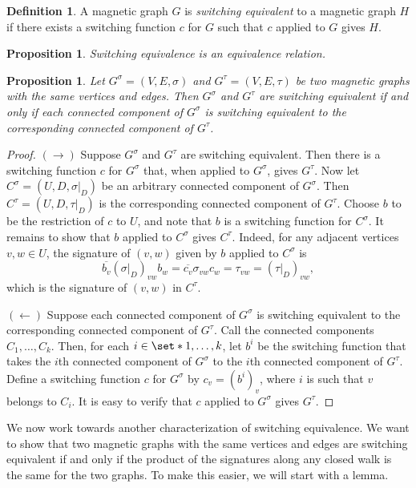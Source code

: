 \documentclass[12pt]{article}
\newtheorem{prop}[thm]{Proposition}
\theoremstyle{definition}
\newtheorem{defn}[thm]{Definition}
\begin{document}
\begin{defn}
A magnetic graph $G$ is \textit{switching equivalent} to a magnetic graph $H$ if there exists a switching function $c$ for $G$ such that $c$ applied to $G$ gives $H$.   
\end{defn}

\begin{prop}
Switching equivalence is an equivalence relation.
\end{prop}

\begin{prop}\label{switching equivalence of connected components}
Let $G^\sigma = (V, E, \sigma)$ and $G^\tau = (V, E, \tau)$ be two magnetic graphs with the same vertices and edges. Then $G^\sigma$ and $G^\tau$ are switching equivalent if and only if each connected component of $G^\sigma$ is switching equivalent to the corresponding connected component of $G^\tau$.
\end{prop}

\begin{proof}
$(\rightarrow)$ Suppose $G^\sigma$ and $G^\tau$ are switching equivalent. Then there is a switching function $c$ for $G^\sigma$ that, when applied to $G^\sigma$, gives $G^\tau$. Now let $C^\sigma=(U, D, \sigma|_{D})$ be an arbitrary connected component of $G^\sigma$. Then $C^\tau=(U, D, \tau|_{D})$ is the corresponding connected component of $G^\tau$. Choose $b$ to be the restriction of $c$ to $U$, and note that $b$ is a switching function for $C^\sigma$. It remains to show that $b$ applied to $C^\sigma$ gives $C^\tau$. Indeed, for any adjacent vertices $v, w \in U$, the signature of $(v, w)$ given by $b$ applied to $C^\sigma$ is
$$
\overline{b_v} (\sigma|_D)_{vw} b_w 
= \overline{c_v} \sigma_{vw} c_w
= \tau_{vw}
= (\tau|_{D})_{vw},
$$
which is the signature of $(v, w)$ in $C^\tau$.

$(\leftarrow)$ Suppose each connected component of $G^\sigma$ is switching equivalent to the corresponding connected component of $G^\tau$. Call the connected components $C_1, \dots, C_k.$ Then, for each $i \in \set*{1, \dots, k}$, let $b^i$ be the switching function that takes the $i$th connected component of $G^\sigma$ to the $i$th connected component of $G^\tau$. Define a switching function $c$ for $G^\sigma$ by $c_v = (b^i)_v$, where $i$ is such that $v$ belongs to $C_i$. It is easy to verify that $c$ applied to $G^\sigma$ gives $G^\tau$.
\end{proof}

We now work towards another characterization of switching equivalence. We want to show that two magnetic graphs with the same vertices and edges are switching equivalent if and only if the product of the signatures along any closed walk is the same for the two graphs. To make this easier, we will start with a lemma.
\end{document}
